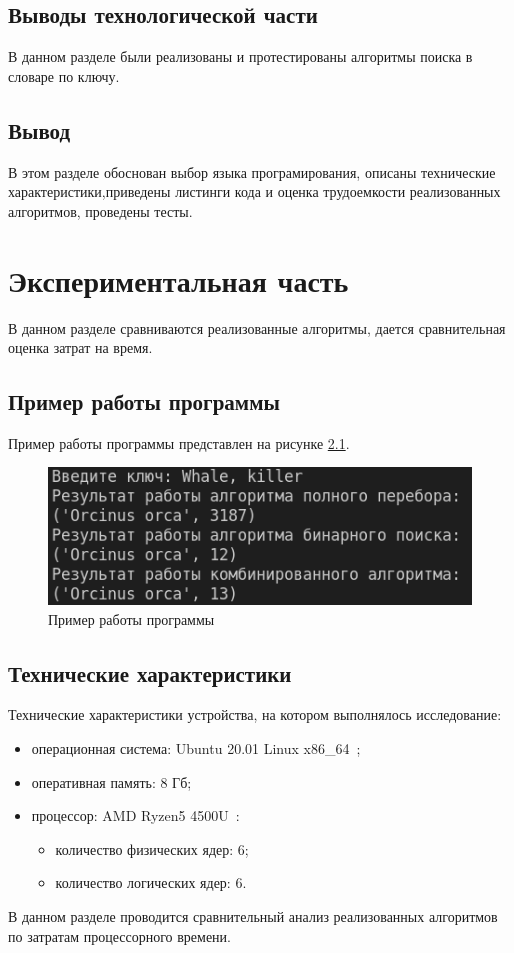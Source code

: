 \documentclass[a4paper,oneside,14pt]{extreport}
\begin{document}
\section{Выводы технологической части}
В данном разделе были реализованы и протестированы алгоритмы поиска в словаре по ключу.

\section*{Вывод}
В этом разделе обоснован выбор языка програмирования, описаны технические характеристики,приведены листинги кода и оценка трудоемкости реализованных алгоритмов, проведены тесты.
\newpage

\chapter{Экспериментальная часть}
В данном разделе сравниваются реализованные алгоритмы, дается сравнительная оценка затрат на время.

\section{Пример работы программы}
Пример работы программы представлен на рисунке \ref{fig:ex}. 
\captionsetup{singlelinecheck=true}
\begin{figure}[H]
	\centering
	\includegraphics[width=1\linewidth]{images/ex}
	\caption{Пример работы программы}
	\label{fig:ex}
\end{figure}

\section{Технические характеристики}
Технические характеристики устройства, на котором выполнялось исследование:
\begin{itemize}
	\item операционная система: Ubuntu 20.01 Linux x86\_64~\cite{ubuntu};
	\item оперативная память: 8 Гб;
	\item процессор: AMD Ryzen5 4500U~\cite{processor}:
	\begin{itemize}
		\item количество физических ядер: 6;
		\item количество логических ядер: 6.
	\end{itemize}
\end{itemize}
В данном разделе проводится сравнительный анализ реализованных алгоритмов по затратам процессорного времени.
\end{document}
